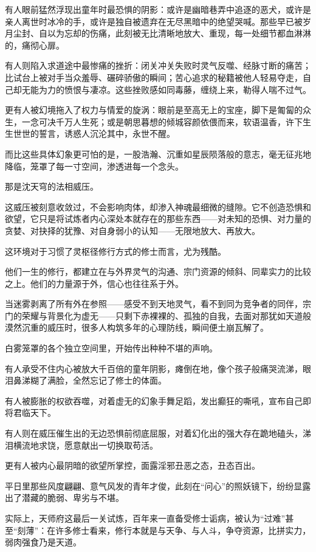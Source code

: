 有人眼前猛然浮现出童年时最恐惧的阴影：或许是幽暗巷弄中追逐的恶犬，或许是亲人离世时冰冷的手，或许是独自被遗弃在无尽黑暗中的绝望哭喊。那些早已被岁月尘封、自以为忘却的伤痛，此刻被无比清晰地放大、重现，每一处细节都血淋淋的，痛彻心扉。

有人则陷入求道途中最惨痛的挫折：闭关冲关失败时灵气反噬、经脉寸断的痛苦；比试台上被对手当众羞辱、碾碎骄傲的瞬间；苦心追求的秘籍被他人轻易夺走，自己却无能为力的愤恨与凄凉。这些挫败感如同毒藤，缠绕上来，勒得人喘不过气。

更有人被幻境拖入了权力与情爱的旋涡：眼前是至高无上的宝座，脚下是匍匐的众生，一念可决千万人生死；或是朝思暮想的倾城容颜依偎而来，软语温香，许下生生世世的誓言，诱惑人沉沦其中，永世不醒。

而比这些具体幻象更可怕的是，一股浩瀚、沉重如星辰陨落般的意志，毫无征兆地降临，笼罩了每一寸空间，渗透进每一个念头。

那是沈天穹的法相威压。

这威压被刻意收敛过，不会影响肉体，却渗入神魂最细微的缝隙。它不创造恐惧和欲望，它只是将试炼者内心深处本就存在的那些东西——对未知的恐惧、对力量的贪婪、对抉择的犹豫、对自身弱小的认知——无限地放大、再放大。

这环境对于习惯了灵枢径修行方式的修士而言，尤为残酷。

他们一生的修行，都建立在与外界灵气的沟通、宗门资源的倾斜、同辈实力的比较之上。他们的力量源于外，信心也往往系于外。

当迷雾剥离了所有外在参照——感受不到天地灵气，看不到同为竞争者的同伴，宗门的荣耀与背景化为虚无——只剩下赤裸裸的、孤独的自我，去面对那犹如天道般漠然沉重的威压时，很多人构筑多年的心理防线，瞬间便土崩瓦解了。

白雾笼罩的各个独立空间里，开始传出种种不堪的声响。

有人承受不住内心被放大千百倍的童年阴影，瘫倒在地，像个孩子般痛哭流涕，眼泪鼻涕糊了满脸，全然忘记了修士的体面。

有人被膨胀的权欲吞噬，对着虚无的幻象手舞足蹈，发出癫狂的嘶吼，宣布自己即将君临天下。

有人则在威压催生出的无边恐惧前彻底屈服，对着幻化出的强大存在跪地磕头，涕泪横流地求饶，愿意献出一切换取苟活。

更有人被内心最阴暗的欲望所掌控，面露淫邪丑恶之态，丑态百出。

平日里那些风度翩翩、意气风发的青年才俊，此刻在“问心”的照妖镜下，纷纷显露出了潜藏的脆弱、卑劣与不堪。

\vspace{2em}

实际上，天师府这最后一关试炼，百年来一直备受修士诟病，被认为“过难”甚至“刻薄”：在许多修士看来，修行本就是与天争、与人斗，争夺资源，比拼实力，弱肉强食乃是天道。


